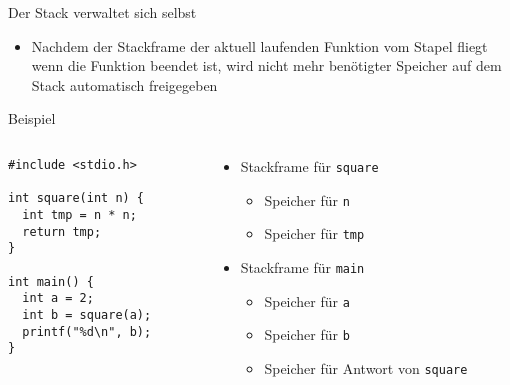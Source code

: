 \documentclass[presentation]{beamer}
\begin{document}
\begin{frame}[label={sec:orgfd61222},fragile]{Der Stack verwaltet sich selbst}
 \begin{itemize}
\item Nachdem der Stackframe der aktuell laufenden Funktion vom Stapel
fliegt wenn die Funktion beendet ist, wird nicht mehr benötigter
Speicher auf dem Stack automatisch freigegeben
\end{itemize}
\begin{exampleblock}{Beispiel}
\begin{columns}
\begin{column}{0.15\columnwidth}
\begin{verbatim}
#include <stdio.h>

int square(int n) {
  int tmp = n * n;
  return tmp;
}

int main() {
  int a = 2;
  int b = square(a);
  printf("%d\n", b);
}
\end{verbatim}
\end{column}
\begin{column}{0.7\columnwidth}
\begin{itemize}
\item Stackframe für {\color{solarizedYellow}\verb!square!}
\begin{itemize}
\item Speicher für {\color{solarizedYellow}\verb!n!}
\item Speicher für {\color{solarizedYellow}\verb!tmp!}
\end{itemize}
\item Stackframe für {\color{solarizedYellow}\verb!main!}
\begin{itemize}
\item Speicher für {\color{solarizedYellow}\verb!a!}
\item Speicher für {\color{solarizedYellow}\verb!b!}
\item Speicher für Antwort von {\color{solarizedYellow}\verb!square!}
\end{itemize}
\end{itemize}
\end{column}
\end{columns}
\end{exampleblock}
\end{frame}
\end{document}
